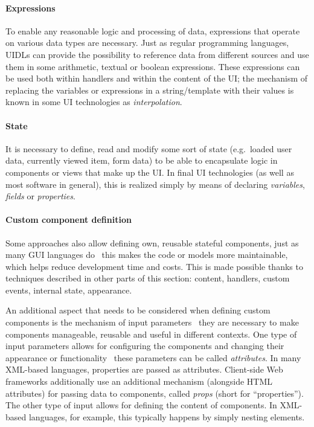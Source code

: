 \paragraph{Expressions}
To enable any reasonable logic and processing of data, expressions that operate on various data types are necessary.
Just as regular programming languages, UIDLs can provide the possibility to reference data from different sources and use them in some arithmetic, textual or boolean expressions.
These expressions can be used both within handlers and within the content of the UI;
the mechanism of replacing the variables or expressions in a string/template with their values is known in some UI technologies as \emph{interpolation}.

\paragraph{State}
It is necessary to define, read and modify some sort of state (e.g.\ loaded user data, currently viewed item, form data) to be able to encapsulate logic in components or views that make up the UI\@.
In final UI technologies (as well as most software in general), this is realized simply by means of declaring \emph{variables}, \emph{fields} or \emph{properties}.

\paragraph{Custom component definition}
Some approaches also allow defining own, reusable stateful components, just as many GUI languages do \textendash\ this makes the code or models more maintainable, which helps reduce development time and costs.
This is made possible thanks to techniques described in other parts of this section: content, handlers, custom events, internal state, appearance.

An additional aspect that needs to be considered when defining custom components is the mechanism of input parameters \textendash\ they are necessary to make components manageable, reusable and useful in different contexts.
One type of input parameters allows for configuring the components and changing their appearance or functionality \textendash\ these parameters can be called \emph{attributes}.
In many XML-based languages, properties are passed as attributes.
Client-side Web frameworks additionally use an additional mechanism (alongside HTML attributes) for passing data to components, called \emph{props} (short for \enquote{properties}).
The other type of input allows for defining the content of components.
In XML-based languages, for example, this typically happens by simply nesting elements.

